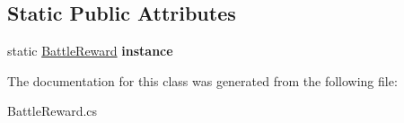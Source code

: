 \subsection*{Static Public Attributes}
\begin{DoxyCompactItemize}
\item 
\mbox{\label{class_battle_reward_a815bc30f4ee354c898685f00d4740b75}} 
static \mbox{\hyperlink{class_battle_reward}{Battle\+Reward}} {\bfseries instance}
\end{DoxyCompactItemize}


The documentation for this class was generated from the following file\+:\begin{DoxyCompactItemize}
\item 
Battle\+Reward.\+cs\end{DoxyCompactItemize}
